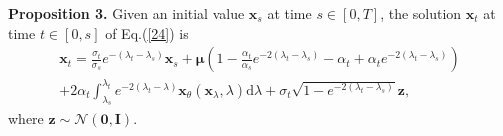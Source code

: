 \textbf{Proposition 3.} Given an initial value $\boldsymbol{x}_s$ at time $s\in[0,T]$, the solution $\boldsymbol{x}_t$ at time $t\in[0,s]$ of Eq.(\ref{24}) is 
\begin{equation}
\begin{aligned}
\boldsymbol{x}_t=\frac{\sigma_t}{\sigma_s}e^{-(\lambda_t-\lambda_s)}\boldsymbol{x}_s
+\boldsymbol\mu\left(1-\frac{\alpha_t}{\alpha_s}e^{-2(\lambda_t-\lambda_s)}-\alpha_t+\alpha_t e^{-2(\lambda_t-\lambda_s)}\right)\\
+2\alpha_t\int_{\lambda_s}^{\lambda_t}e^{-2(\lambda_t-\lambda)}\boldsymbol{x}_\theta(\boldsymbol{x}_\lambda,\lambda)\mathrm{d}\lambda
+\sigma_t\sqrt{1-e^{-2(\lambda_t-\lambda_s)}}\boldsymbol{z},
\label{prop3}
\end{aligned}
\end{equation}
where $\boldsymbol{z}\sim\mathcal{N}(\mathbf{0},\boldsymbol{I})$.

